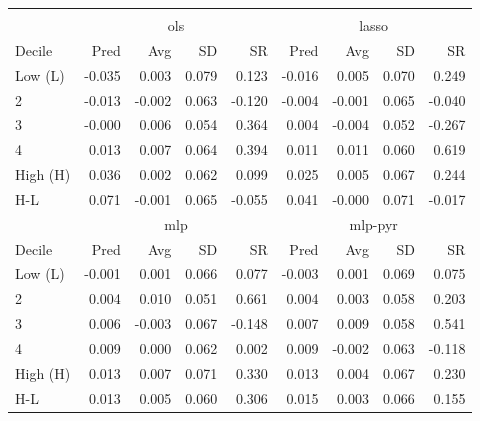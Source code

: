 \begin{tabular}{lrrrrrrrr}
\hline \hline \\ [-1.8ex]
 & \multicolumn{4}{c}{ols} & \multicolumn{4}{c}{lasso} \\
 \cmidrule(lr){2-5} \cmidrule(lr){6-9}
Decile & Pred & Avg & SD & SR & Pred & Avg & SD & SR \\
\midrule
Low (L) & -0.035 & 0.003 & 0.079 & 0.123 & -0.016 & 0.005 & 0.070 & 0.249 \\
2 & -0.013 & -0.002 & 0.063 & -0.120 & -0.004 & -0.001 & 0.065 & -0.040 \\
3 & -0.000 & 0.006 & 0.054 & 0.364 & 0.004 & -0.004 & 0.052 & -0.267 \\
4 & 0.013 & 0.007 & 0.064 & 0.394 & 0.011 & 0.011 & 0.060 & 0.619 \\
High (H) & 0.036 & 0.002 & 0.062 & 0.099 & 0.025 & 0.005 & 0.067 & 0.244 \\
H-L & 0.071 & -0.001 & 0.065 & -0.055 & 0.041 & -0.000 & 0.071 & -0.017 \\
\midrule
 & \multicolumn{4}{c}{mlp} & \multicolumn{4}{c}{mlp-pyr} \\
 \cmidrule(lr){2-5} \cmidrule(lr){6-9}
Decile & Pred & Avg & SD & SR & Pred & Avg & SD & SR \\
\midrule
Low (L) & -0.001 & 0.001 & 0.066 & 0.077 & -0.003 & 0.001 & 0.069 & 0.075 \\
2 & 0.004 & 0.010 & 0.051 & 0.661 & 0.004 & 0.003 & 0.058 & 0.203 \\
3 & 0.006 & -0.003 & 0.067 & -0.148 & 0.007 & 0.009 & 0.058 & 0.541 \\
4 & 0.009 & 0.000 & 0.062 & 0.002 & 0.009 & -0.002 & 0.063 & -0.118 \\
High (H) & 0.013 & 0.007 & 0.071 & 0.330 & 0.013 & 0.004 & 0.067 & 0.230 \\
H-L & 0.013 & 0.005 & 0.060 & 0.306 & 0.015 & 0.003 & 0.066 & 0.155 \\
\hline \hline
\end{tabular}